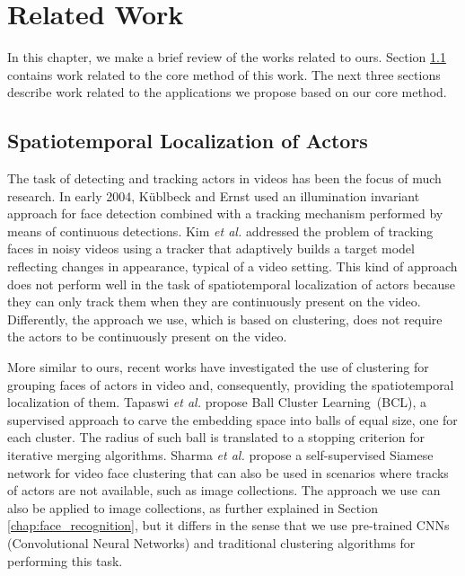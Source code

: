 \newpage

\chapter{Related Work}
\label{chap:related}

In this chapter, we make a brief review of the works related to ours. Section \ref{sec:spatiotemporal} contains work related to the core method of this work. The next three sections describe work related to the applications we propose based on our core method.

\section{Spatiotemporal Localization of Actors}
\label{sec:spatiotemporal}


The task of detecting and tracking actors in videos has been the focus of much research. In early 2004, Küblbeck and Ernst \cite{facetracking_2} used an illumination invariant approach for face detection combined with a tracking mechanism performed by means of continuous detections. Kim \emph{et al.} \cite{face_tracking} addressed the problem of tracking faces in noisy videos using a tracker that adaptively builds a target model reflecting changes in appearance, typical of a video setting. This kind of approach does not perform well in the task of spatiotemporal localization of actors because they can only track them when they are continuously present on the video. Differently, the approach we use, which is based on clustering, does not require the actors to be continuously present on the video.

More similar to ours, recent works have investigated the use of clustering for grouping faces of actors in video and, consequently, providing the spatiotemporal localization of them. Tapaswi \emph{et al.} \cite{video_face_clustering} propose Ball Cluster Learning~(BCL), a supervised approach to carve the embedding space into balls of equal size, one for each cluster. The radius of such ball is translated to a stopping criterion for iterative merging algorithms. Sharma \emph{et al.} \cite{self_supervised} propose a self-supervised Siamese network for video face clustering that can also be used in scenarios where tracks of actors are not available, such as image collections. The approach we use can also be applied to image collections, as further explained in Section \ref{chap:face_recognition}, but it differs in the sense that we use pre-trained CNNs (Convolutional Neural Networks) and traditional clustering algorithms for performing this task. 

